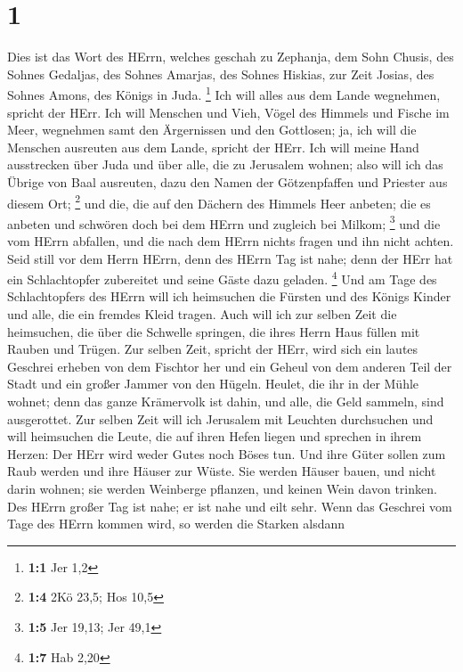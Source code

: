 \hypertarget{section}{%
\section{1}\label{section}}

 Dies ist das Wort des HErrn, welches geschah zu Zephanja,
dem Sohn Chusis, des Sohnes Gedaljas, des Sohnes Amarjas, des Sohnes
Hiskias, zur Zeit Josias, des Sohnes Amons, des Königs in Juda.
\footnote{\textbf{1:1} Jer 1,2}  Ich will alles aus dem
Lande wegnehmen, spricht der HErr.  Ich will Menschen und
Vieh, Vögel des Himmels und Fische im Meer, wegnehmen samt den
Ärgernissen und den Gottlosen; ja, ich will die Menschen ausreuten aus
dem Lande, spricht der HErr.  Ich will meine Hand
ausstrecken über Juda und über alle, die zu Jerusalem wohnen; also will
ich das Übrige von Baal ausreuten, dazu den Namen der Götzenpfaffen und
Priester aus diesem Ort; \footnote{\textbf{1:4} 2Kö 23,5; Hos 10,5}
 und die, die auf den Dächern des Himmels Heer anbeten; die
es anbeten und schwören doch bei dem HErrn und zugleich bei Milkom;
\footnote{\textbf{1:5} Jer 19,13; Jer 49,1}  und die vom
HErrn abfallen, und die nach dem HErrn nichts fragen und ihn nicht
achten.  Seid still vor dem Herrn HErrn, denn des HErrn Tag
ist nahe; denn der HErr hat ein Schlachtopfer zubereitet und seine Gäste
dazu geladen. \footnote{\textbf{1:7} Hab 2,20}  Und am Tage
des Schlachtopfers des HErrn will ich heimsuchen die Fürsten und des
Königs Kinder und alle, die ein fremdes Kleid tragen.  Auch
will ich zur selben Zeit die heimsuchen, die über die Schwelle springen,
die ihres Herrn Haus füllen mit Rauben und Trügen.  Zur
selben Zeit, spricht der HErr, wird sich ein lautes Geschrei erheben von
dem Fischtor her und ein Geheul von dem anderen Teil der Stadt und ein
großer Jammer von den Hügeln.  Heulet, die ihr in der Mühle
wohnet; denn das ganze Krämervolk ist dahin, und alle, die Geld sammeln,
sind ausgerottet.  Zur selben Zeit will ich Jerusalem mit
Leuchten durchsuchen und will heimsuchen die Leute, die auf ihren Hefen
liegen und sprechen in ihrem Herzen: Der HErr wird weder Gutes noch
Böses tun.  Und ihre Güter sollen zum Raub werden und ihre
Häuser zur Wüste. Sie werden Häuser bauen, und nicht darin wohnen; sie
werden Weinberge pflanzen, und keinen Wein davon trinken. 
Des HErrn großer Tag ist nahe; er ist nahe und eilt sehr. Wenn das
Geschrei vom Tage des HErrn kommen wird, so werden die Starken alsdann
